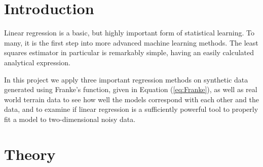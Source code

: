 \documentclass[a4paper, 10pt]{article}
\begin{document}
\begin{multicols}{2}
\section{Introduction}

Linear regression is a basic, but highly important form of statistical learning. To many, it is the first step into more advanced machine learning methods. The least squares estimator in particular is remarkably simple, having an easily calculated analytical expression.

In this project we apply three important regression methods on synthetic data generated using Franke's function, given in Equation (\ref{eq:Franke}), as well as real world terrain data to see how well the models correspond with each other and the data, and to examine if linear regression is a sufficiently powerful tool to properly fit a model to two-dimensional noisy data.


\section{Theory}

\end{multicols}
\end{document}
